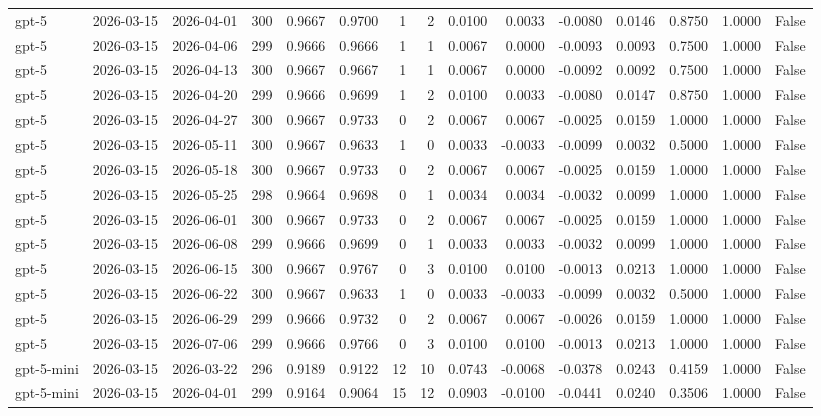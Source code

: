\begin{table}
\begin{tabular}{lllrrrrrrrrrrrr}
gpt-5 & 2026-03-15 & 2026-04-01 & 300 & 0.9667 & 0.9700 & 1 & 2 & 0.0100 & 0.0033 & -0.0080 & 0.0146 & 0.8750 & 1.0000 & False \\
gpt-5 & 2026-03-15 & 2026-04-06 & 299 & 0.9666 & 0.9666 & 1 & 1 & 0.0067 & 0.0000 & -0.0093 & 0.0093 & 0.7500 & 1.0000 & False \\
gpt-5 & 2026-03-15 & 2026-04-13 & 300 & 0.9667 & 0.9667 & 1 & 1 & 0.0067 & 0.0000 & -0.0092 & 0.0092 & 0.7500 & 1.0000 & False \\
gpt-5 & 2026-03-15 & 2026-04-20 & 299 & 0.9666 & 0.9699 & 1 & 2 & 0.0100 & 0.0033 & -0.0080 & 0.0147 & 0.8750 & 1.0000 & False \\
gpt-5 & 2026-03-15 & 2026-04-27 & 300 & 0.9667 & 0.9733 & 0 & 2 & 0.0067 & 0.0067 & -0.0025 & 0.0159 & 1.0000 & 1.0000 & False \\
gpt-5 & 2026-03-15 & 2026-05-11 & 300 & 0.9667 & 0.9633 & 1 & 0 & 0.0033 & -0.0033 & -0.0099 & 0.0032 & 0.5000 & 1.0000 & False \\
gpt-5 & 2026-03-15 & 2026-05-18 & 300 & 0.9667 & 0.9733 & 0 & 2 & 0.0067 & 0.0067 & -0.0025 & 0.0159 & 1.0000 & 1.0000 & False \\
gpt-5 & 2026-03-15 & 2026-05-25 & 298 & 0.9664 & 0.9698 & 0 & 1 & 0.0034 & 0.0034 & -0.0032 & 0.0099 & 1.0000 & 1.0000 & False \\
gpt-5 & 2026-03-15 & 2026-06-01 & 300 & 0.9667 & 0.9733 & 0 & 2 & 0.0067 & 0.0067 & -0.0025 & 0.0159 & 1.0000 & 1.0000 & False \\
gpt-5 & 2026-03-15 & 2026-06-08 & 299 & 0.9666 & 0.9699 & 0 & 1 & 0.0033 & 0.0033 & -0.0032 & 0.0099 & 1.0000 & 1.0000 & False \\
gpt-5 & 2026-03-15 & 2026-06-15 & 300 & 0.9667 & 0.9767 & 0 & 3 & 0.0100 & 0.0100 & -0.0013 & 0.0213 & 1.0000 & 1.0000 & False \\
gpt-5 & 2026-03-15 & 2026-06-22 & 300 & 0.9667 & 0.9633 & 1 & 0 & 0.0033 & -0.0033 & -0.0099 & 0.0032 & 0.5000 & 1.0000 & False \\
gpt-5 & 2026-03-15 & 2026-06-29 & 299 & 0.9666 & 0.9732 & 0 & 2 & 0.0067 & 0.0067 & -0.0026 & 0.0159 & 1.0000 & 1.0000 & False \\
gpt-5 & 2026-03-15 & 2026-07-06 & 299 & 0.9666 & 0.9766 & 0 & 3 & 0.0100 & 0.0100 & -0.0013 & 0.0213 & 1.0000 & 1.0000 & False \\
gpt-5-mini & 2026-03-15 & 2026-03-22 & 296 & 0.9189 & 0.9122 & 12 & 10 & 0.0743 & -0.0068 & -0.0378 & 0.0243 & 0.4159 & 1.0000 & False \\
gpt-5-mini & 2026-03-15 & 2026-04-01 & 299 & 0.9164 & 0.9064 & 15 & 12 & 0.0903 & -0.0100 & -0.0441 & 0.0240 & 0.3506 & 1.0000 & False \\

\end{tabular}
\end{table}
